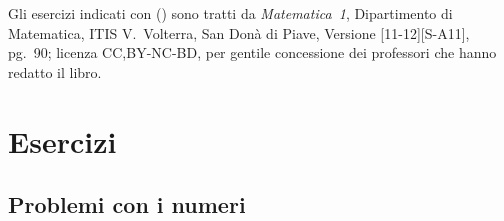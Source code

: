 
Gli esercizi indicati con (\croce) sono tratti da \emph{Matematica~1}, Dipartimento di Matematica, ITIS V.~Volterra, San Donà di Piave, Versione [11-12][S-A11], pg.~90;
licenza CC,BY-NC-BD, per gentile concessione dei professori che hanno redatto il libro.

\section{Esercizi}
\subsection{Problemi con i numeri}
